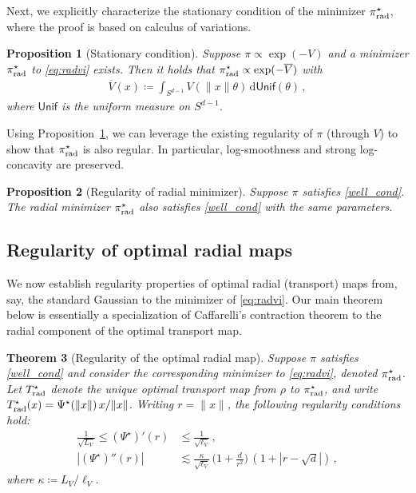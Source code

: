 \documentclass[twoside]{article}
\newcommand{\1}{\mathds{1}}
\newcommand*{\defeq}{\coloneqq}
\newcommand*{\rd}{\mathrm{d}}
\newcommand*{\dd}{\, \rd}
\newcommand{\pirad}{\pi_{\rm rad}}
\theoremstyle{plain}
\newtheorem{theorem}{Theorem}[section]
\newtheorem{prop}[theorem]{Proposition}
\theoremstyle{definition}
\theoremstyle{remark}
\begin{document}
Next, we explicitly characterize the stationary condition of the minimizer $\pirad^\star$, where the proof is based on calculus of variations. 
\begin{prop}[Stationary condition]\label{stationary_cond} Suppose $\pi \propto \exp(-V)$ and a minimizer $\pirad^\star$ to \eqref{eq:radvi} exists. Then it holds that $\pirad^\star\propto\exp(-\overline{V})$ with
\begin{align}\label{eq:stationary}
    \overline{V}(x) \defeq \int_{S^{d-1}} V(\|x\|\theta) \dd {\mathsf{Unif}}(\theta)\,,
\end{align}
where ${\mathsf{Unif}}$ is the uniform measure on $S^{d-1}$.
\end{prop}
Using Proposition~\ref{stationary_cond}, we can leverage the existing regularity of $\pi$ (through $V$) to show that $\pirad^\star$ is also regular. In particular, log-smoothness and strong log-concavity are preserved.
\begin{prop}[Regularity of radial minimizer]\label{reg_radial}
Suppose $\pi$ satisfies \eqref{well_cond}. The radial minimizer $\pirad^\star$ also satisfies \eqref{well_cond} with the same parameters.
\end{prop}


\subsection{Regularity of optimal radial maps}\label{sec:reg_ot_map}


We now establish regularity properties of optimal radial (transport) maps from, say, the standard Gaussian to the minimizer of \eqref{eq:radvi}. Our main theorem below is essentially a specialization of Caffarelli's contraction theorem \citep{Caffarelli2000} to the radial component of the optimal transport map. 


\begin{theorem}[Regularity of the optimal radial map]\label{theorem_map_regularity} 
Suppose $\pi$ satisfies \eqref{well_cond} and consider the corresponding minimizer to \eqref{eq:radvi}, denoted $\pirad^\star$. Let $T^\star_{\rm{rad}}$ denote the unique optimal transport map from $\rho$ to $\pirad^\star$, and write $T_{\rm rad}^\star(x) = \Psi^\star(\|x\|)\,x/\|x\|$. Writing $r = \|x\|$, the following regularity conditions hold:
\begin{align*}
    \frac{1}{\sqrt{L_V}} \leq (\Psi^\star)'(r) &\leq \frac{1}{\sqrt{\ell_V}}\,, \\
    \left|(\Psi^\star)''(r) \right|
    &\lesssim
    {\frac{\kappa}{\sqrt{\ell_V}}\,\bigl(1 + \frac{d}{r^2}\bigr)\,(1+|r-\sqrt d|)}\,,
\end{align*}
where $\kappa \defeq L_V/\ell_V$.
\end{theorem}
\end{document}
